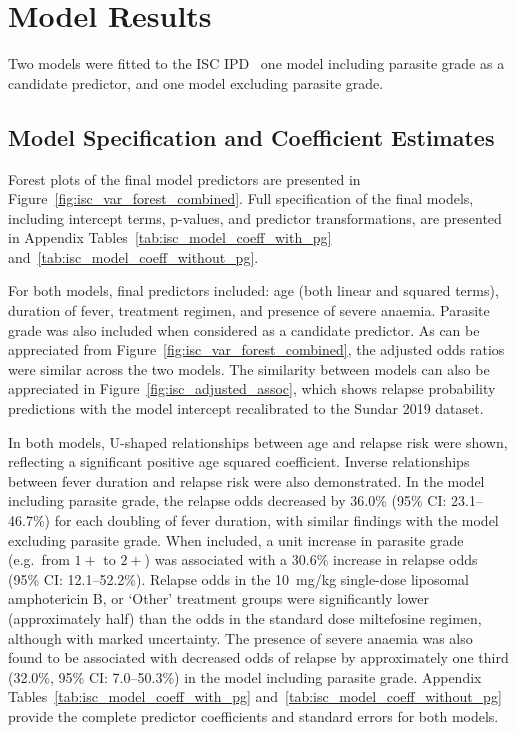 \section{Model Results}

Two models were fitted to the ISC IPD \textemdash\ one model including parasite grade as a candidate predictor, and one model excluding parasite grade.

\subsection{Model Specification and Coefficient Estimates}

Forest plots of the final model predictors are presented in Figure~\ref{fig:isc_var_forest_combined}. Full specification of the final models, including intercept terms, p-values, and predictor transformations, are presented in Appendix Tables~\ref{tab:isc_model_coeff_with_pg} and~\ref{tab:isc_model_coeff_without_pg}.

For both models, final predictors included: age (both linear and squared terms), duration of fever, treatment regimen, and presence of severe anaemia. Parasite grade was also included when considered as a candidate predictor. As can be appreciated from Figure~\ref{fig:isc_var_forest_combined}, the adjusted odds ratios were similar across the two models. The similarity between models can also be appreciated in Figure~\ref{fig:isc_adjusted_assoc}, which shows relapse probability predictions with the model intercept recalibrated to the Sundar 2019 dataset\cite{sundar2019}.

In both models, U-shaped relationships between age and relapse risk were shown, reflecting a significant positive age squared coefficient. Inverse relationships between fever duration and relapse risk were also demonstrated. In the model including parasite grade, the relapse odds decreased by 36.0\% (95\% CI\@: 23.1--46.7\%) for each doubling of fever duration, with similar findings with the model excluding parasite grade. When included, a unit increase in parasite grade (e.g.\ from $1+$ to $2+$) was associated with a 30.6\% increase in relapse odds (95\% CI\@: 12.1--52.2\%). Relapse odds in the 10~mg/kg single-dose liposomal amphotericin B, or `Other' treatment groups were significantly lower (approximately half) than the odds in the standard dose miltefosine regimen, although with marked uncertainty. The presence of severe anaemia was also found to be associated with decreased odds of relapse by approximately one third (32.0\%, 95\% CI\@: 7.0--50.3\%) in the model including parasite grade. Appendix Tables~\ref{tab:isc_model_coeff_with_pg} and~\ref{tab:isc_model_coeff_without_pg} provide the complete predictor coefficients and standard errors for both models.

